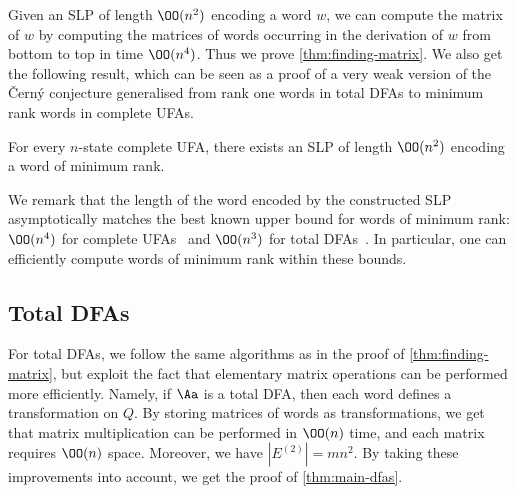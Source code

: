 \noindent
Given an SLP of length $\OO(n^2)$ encoding a word $w$, we can compute the matrix of $w$ by computing the matrices of words occurring in the derivation of $w$ from bottom to top in time $\OO(n^4)$.
Thus we prove \autoref{thm:finding-matrix}. We also get the following result, which can be seen as a proof of a very weak version of the \v{C}ern\'{y} conjecture generalised from rank one words in total DFAs to minimum rank words in complete UFAs.

\begin{thm}
    For every $n$-state complete UFA, there exists an SLP of length $\OO(n^2)$ encoding a word of minimum rank.
\end{thm}

\noindent
We remark that the length of the word encoded by the constructed SLP asymptotically matches the best known upper bound  for words of minimum rank: $\OO(n^4)$ for complete UFAs~\cite{Carpi1988} and $\OO(n^3)$ for total DFAs~\cite{Klyachko1987}. In particular, one can efficiently compute words of minimum rank within these bounds.

\subsection{Total DFAs}\label{subsec-dfas}

For total DFAs, we follow the same algorithms as in the proof of \autoref{thm:finding-matrix}, but exploit the fact that elementary matrix operations can be performed more efficiently. Namely, if $\Aa$ is a total DFA, then each word defines a transformation on $Q$. By storing matrices of words as transformations, we get that matrix multiplication can be performed in $\OO(n)$ time, and each matrix requires $\OO(n)$ space. Moreover, we have $|E^{(2)}| = mn^2$. By taking these improvements into account, we get the proof of \autoref{thm:main-dfas}.



